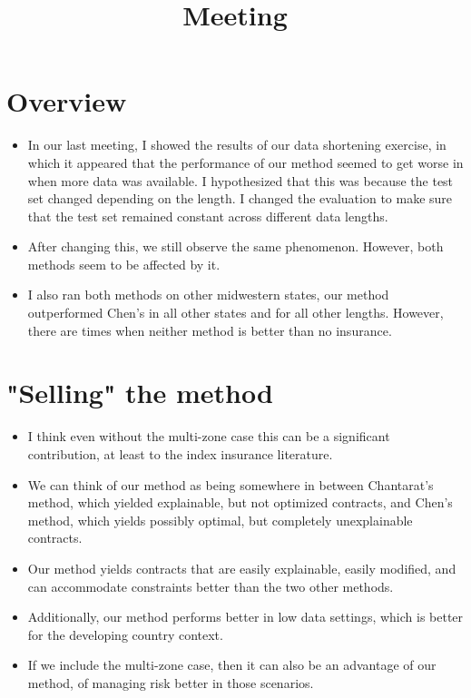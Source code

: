 \documentclass[11pt]{article}
\title{Meeting}
\begin{document}
\maketitle
\section{Overview}
  \begin{itemize}
    \item In our last meeting, I showed the results of our data shortening exercise, in which it appeared that the performance of our method seemed to get worse in when more data was available. I hypothesized that this was because the test set changed depending on the length. I changed the evaluation to make sure that the test set remained constant across different data lengths.  
    \item After changing this, we still observe the same phenomenon. However, both methods seem to be affected by it. 
    \item I also ran both methods on other midwestern states, our method outperformed Chen's in all other states and for all other lengths. However, there are times when neither method is better than no insurance. 
  \end{itemize}

\section{"Selling" the method}
  \begin{itemize}
    \item I think even without the multi-zone case this can be a significant contribution, at least to the index insurance literature. 
    \item We can think of our method as being somewhere in between Chantarat's method, which yielded explainable, but not optimized contracts, and Chen's method, which yields possibly optimal, but completely unexplainable contracts. 
    \item Our method yields contracts that are easily explainable, easily modified, and can accommodate constraints better than the two other methods. 
    \item Additionally, our method performs better in low data settings, which is better for the developing country context.
    \item If we include the multi-zone case, then it can also be an advantage of our method, of managing risk better in those scenarios. 
  \end{itemize}
\end{document}
